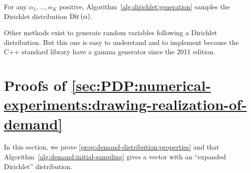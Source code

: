 \begin{prop}
For any $\alpha_1,\ldots,\alpha_K$ positive, Algorithm~\ref{alg:dirichlet:generation} samples the Dirichlet distribution $\Dir\bracket{\alpha}$.
\end{prop}






Other methods exist to generate random variables following a Dirichlet distribution.
But this one is easy to understand and to implement because the C++ standard library have a gamma generator since the 2011 edition.


\section{Proofs of \cref{sec:PDP:numerical-experiments:drawing-realization-of-demand}}
\label{sec:PDP:numerical-experiments:instances:proofs}


In this section, we prove \cref{prop:demand-distribution:properties} and that Algorithm~\ref{alg:demand:initial-sampling} gives a vector with an ``expanded Dirichlet'' distribution.


